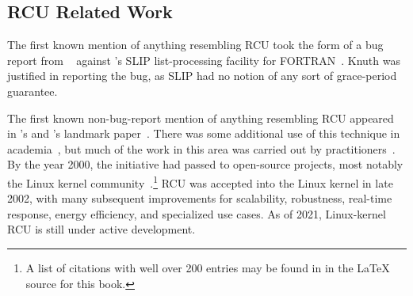 
\subsection{RCU Related Work}
\label{sec:defer:RCU Related Work}

The first known mention of anything resembling RCU took the form of a bug
report from
~\cite[page 413 of Fundamental Algorithms]{Knuth73}
against 's SLIP list-processing facility for
FORTRAN~\cite{Weizenbaum:1963:SLP:367593.367617}.
Knuth was justified in reporting the bug, as SLIP had no notion of
any sort of grace-period guarantee.

The first known non-bug-report mention of anything resembling RCU appeared
in 's and 's landmark
paper~\cite{Kung80}.
There was some additional use of this technique in
academia~\cite{Manber82,Manber84,BarbaraLiskov1988ArgusCACM,Pugh90,Andrews91textbook,Pu95a,Cowan96a,Rastogi:1997:LPV:645923.671017,Gamsa99},
but much of the work in this area was carried out by
practitioners~\cite{RichardRashid87a,Hennessy89,Jacobson93,AjuJohn95,Slingwine95,Slingwine97,Slingwine98,McKenney98}.
By the year 2000, the initiative had passed to open-source projects,
most notably the Linux kernel
community~\cite{RustyRussell2000a,RustyRussell2000b,McKenney01b,McKenney01a,McKenney02a,Arcangeli03}.\footnote{
	A list of citations with well over 200 entries may be found in
	 in the {\LaTeX} source for this book.}
RCU was accepted into the Linux kernel in late 2002, with many subsequent
improvements for scalability, robustness, real-time response, energy
efficiency, and specialized use cases.
As of 2021, Linux-kernel RCU is still under active development.

